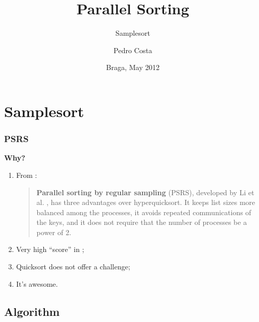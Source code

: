 \documentclass{beamer}
\title{Parallel Sorting}
\subtitle{Samplesort}
\author{Pedro Costa}
\institute[19830]{
	University of Minho\\
	Department of Informatics
}
\date{Braga, May 2012}
\begin{document}

\maketitle%


\section{Samplesort}

\begin{frame}
	\frametitle{PSRS}

		\begin{center}
			\huge\bfseries Why?
		\end{center}
		
	\begin{enumerate}
		\item{From \cite{Quinn2004}:
		\begin{quote}
			\textbf{Parallel sorting by regular sampling} (PSRS), developed by Li et al. \cite{Li1993}, has three advantages over hyperquicksort. It keeps list sizes more balanced among the processes, it avoids repeated communications of the keys, and it does not require that the number of processes be a power of 2.
		\end{quote}
		}
		\item{Very high ``score'' in \cite{Kale2010};}
		\item{Quicksort does not offer a challenge;}
		\item{It's awesome.}
	\end{enumerate}
\end{frame}











\subsection{Algorithm}
\end{document}
